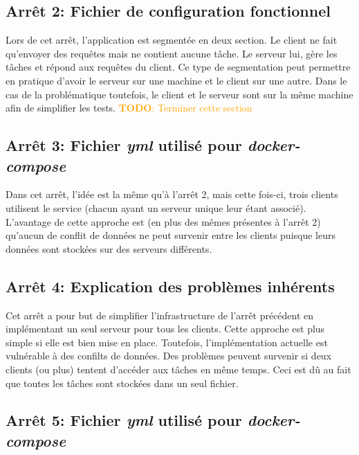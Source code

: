 \documentclass[a11paper, 11pt]{article}
\newcommand{\todo}[1]{\textcolor{orange}{\textbf{TODO}: #1}}
\begin{document}
\subsection{Arrêt 2: Fichier de configuration fonctionnel}


\newpage

Lors de cet arrêt, l'application est segmentée en deux section. Le client ne
fait qu'envoyer des requêtes mais ne contient aucune tâche. Le serveur lui,
gère les tâches et répond aux requêtes du client. Ce type de segmentation peut
permettre en pratique d'avoir le serveur sur une machine et le client sur une
autre. Dans le cas de la problématique toutefois, le client et le serveur sont
sur la même machine afin de simplifier les tests. \todo{Terminer cette section}

\subsection{Arrêt 3: Fichier \textit{yml} utilisé pour \textit{docker-compose}}


Dans cet arrêt, l'idée est la même qu'à l'arrêt 2, mais cette fois-ci, trois
clients utilisent le service (chacun ayant un serveur unique leur étant
associé). L'avantage de cette approche est (en plus des mêmes présentes à
l'arrêt 2) qu'aucun de conflit de données ne peut survenir entre les clients
puisque leurs données sont stockées sur des serveurs différents.

\subsection{Arrêt 4: Explication des problèmes inhérents}

Cet arrêt a pour but de simplifier l'infrastructure de l'arrêt précédent en
implémentant un seul serveur pour tous les clients. Cette approche est plus
simple si elle est bien mise en place. Toutefois, l'implémentation actuelle est
vulnérable à des confilts de données. Des problèmes peuvent survenir si deux
clients (ou plus) tentent d'accéder aux tâches en même temps. Ceci est dû au
fait que toutes les tâches sont stockées dans un seul fichier.

\subsection{Arrêt 5: Fichier \textit{yml} utilisé pour \textit{docker-compose}}

\end{document}
